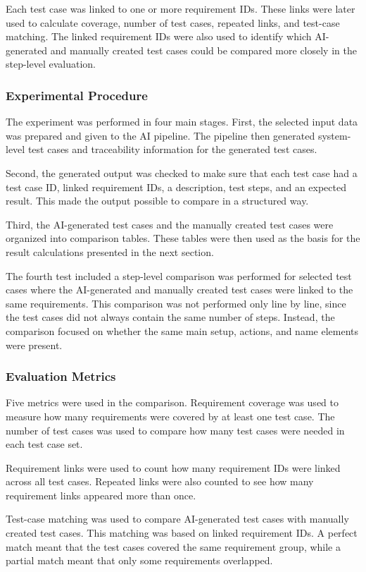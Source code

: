 \documentclass[a4paper,12pt]{article}
\begin{document}
Each test case was linked to one or more requirement IDs. These links were later used to calculate coverage, number of test cases, repeated links, and test-case matching. The linked requirement IDs were also used to identify which AI-generated and manually created test cases could be compared more closely in the step-level evaluation.

\subsubsection{Experimental Procedure}
The experiment was performed in four main stages. First, the selected input data was prepared and given to the AI pipeline. The pipeline then generated system-level test cases and traceability information for the generated test cases.

Second, the generated output was checked to make sure that each test case had a test case ID, linked requirement IDs, a description, test steps, and an expected result. This made the output possible to compare in a structured way.

Third, the AI-generated test cases and the manually created test cases were organized into comparison tables. These tables were then used as the basis for the result calculations presented in the next section.

The fourth test included a step-level comparison was performed for selected test cases where the AI-generated and manually created test cases were linked to the same requirements. This comparison was not performed only line by line, since the test cases did not always contain the same number of steps. Instead, the comparison focused on whether the same main setup, actions, and name elements were present. 


\subsubsection{Evaluation Metrics}
Five metrics were used in the comparison. Requirement coverage was used to measure how many requirements were covered by at least one test case. The number of test cases was used to compare how many test cases were needed in each test case set.

Requirement links were used to count how many requirement IDs were linked across all test cases. Repeated links were also counted to see how many requirement links appeared more than once.

Test-case matching was used to compare AI-generated test cases with manually created test cases. This matching was based on linked requirement IDs. A perfect match meant that the test cases covered the same requirement group, while a partial match meant that only some requirements overlapped.
\end{document}
